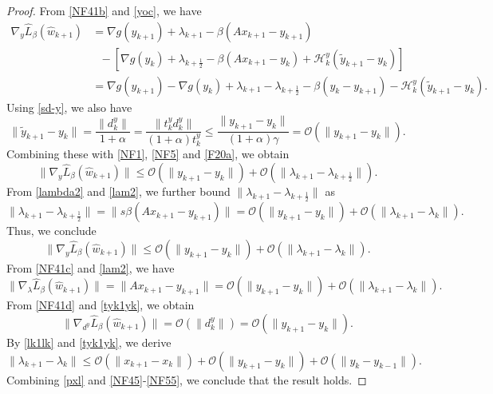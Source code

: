 \documentclass[pdflatex,sn-mathphys-num]{sn-jnl}%
\theoremstyle{thmstyleone}%
\theoremstyle{thmstyletwo}%
\theoremstyle{thmstylethree}%
\begin{document}
\begin{proof}
From \eqref{NF41b} and \eqref{yoc}, we have
\[\begin{aligned}
\nabla_y \hat{L}_{\beta}(\hat{w}_{k+1})&=\nabla g (y_{k+1})+\lambda_{k+1}-\beta(A x_{k+1}-y_{k+1})\\
& \ \ \ -[\nabla g (y_{k})+\lambda_{k+\frac{1}{2}}-\beta(A x_{k+1}-y_{k})+\mathcal{H}_k^y(\tilde{y}_{k+1}-y_{k})]\\
& =\nabla g(y_{k+1})-\nabla g(y_{k})+\lambda_{k+1}-\lambda_{k+\frac{1}{2}}-\beta(y_{k}-y_{k+1})
-\mathcal{H}_k^y(\tilde{y}_{k+1}-y_{k}).
\end{aligned}\]
Using \eqref{sd-y}, we also have
\begin{equation}\label{tyk1yk}
\|\tilde{y}_{k+1}-y_{k}\| =\frac{ \|d_k^y\|}{1+\alpha}=\frac{\|t_k^y d_k^y\|}{(1+\alpha)t_k^y} 
\leq \frac{\|{y}_{k+1}-y_{k}\|}{(1+\alpha)\gamma} =\mathcal{O}(\|{y}_{k+1}-y_{k}\|).
\end{equation}
Combining these with \eqref{NF1}, \eqref{NF5} and \eqref{F20a}, we obtain  	
\[
\|\nabla_y \hat{L}_{\beta}(\hat{w}_{k+1})\|\leq\mathcal{O}(\|{y}_{k+1}-y_{k}\|)
+\mathcal{O}(\|{\lambda}_{k+1}-\lambda_{k+\frac{1}{2}}\|).
\]
From \eqref{lambda2} and \eqref{lam2}, we further bound $\|\lambda_{k+1}-\lambda_{k+\frac{1}{2}}\|$ as
\[
\|\lambda_{k+1}-\lambda_{k+\frac{1}{2}}\|=\|s\beta(Ax_{k+1}-y_{k+1})\|=\mathcal{O}(\|{y}_{k+1}-y_{k}\|)+\mathcal{O}(\|{\lambda}_{k+1}-\lambda_{k}\|).
\]
Thus, we conclude
\begin{equation}\label{NF45}
\|\nabla_y \hat{L}_{\beta}(\hat{w}_{k+1})\|\leq\mathcal{O}(\|{y}_{k+1}-y_{k}\|)
+\mathcal{O}(\|{\lambda}_{k+1}-\lambda_{k}\|).
\end{equation}
From \eqref{NF41c} and \eqref{lam2}, we have
\begin{equation}\label{NF47}
\|\nabla_\lambda \hat{L}_{\beta}(\hat{w}_{k+1})\|=\|Ax_{k+1}-y_{k+1}\|=\mathcal{O}(\|{y}_{k+1}-y_{k}\|)+\mathcal{O}(\|{\lambda}_{k+1}-\lambda_{k}\|).
\end{equation}
From \eqref{NF41d} and \eqref{tyk1yk}, we obtain
\begin{equation}\label{NF50}
\|\nabla_{d^y}\hat{L}_{\beta}(\hat{w}_{k+1})\|=\mathcal{O}(\|d^y_k\|)=\mathcal{O}(\|{y}_{k+1}-y_{k}\|).
\end{equation}
By \eqref{lk1lk} and \eqref{tyk1yk}, we derive
\begin{equation}\label{NF55}
\|{\lambda}_{k+1}-\lambda_{k}\|\leq\mathcal{O}(\|{x}_{k+1}-x_{k}\|)
+\mathcal{O}(\|{y}_{k+1}-y_{k}\|)+\mathcal{O}(\|{y}_{k}-y_{k-1}\|).
\end{equation}
Combining \eqref{pxl} and \eqref{NF45}-\eqref{NF55}, we conclude that the result holds.
\end{proof}
\end{document}
